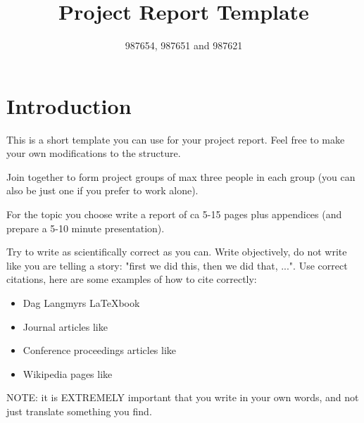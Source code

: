 

\title{Project Report Template}
\author{987654, 987651 and 987621}



\maketitle


\thispagestyle{empty}

\clearpage
{}
\setcounter{page}{1}
\tableofcontents

\clearpage
{}

\section{Introduction}

This is a short template you can use for your project report. Feel free to
make your own modifications to the structure. 

Join together to form project groups of max three people in each group (you can
also be just one if you prefer to work alone).

For the topic you choose write a report of ca 5-15 pages plus appendices (and prepare a 5-10
minute presentation).

Try to write as scientifically correct as you can. Write objectively, do not
write like you are telling a story: "first we did this, then we did that, ...".
Use correct citations, here are some examples of how to cite correctly:
\begin{itemize}
\item Dag Langmyrs \LaTeX book~\cite{Langmyr:03}
\item Journal articles like~\cite{Klein:09}
\item Conference proceedings articles like~\cite{Begnum:07} 
\item Wikipedia pages like~\cite{wikipedia:kerberos:10}
\end{itemize}

NOTE: it is EXTREMELY important that you write in your own words, and not
just translate something you find. 

